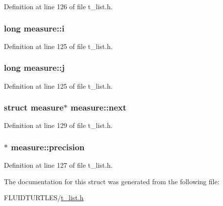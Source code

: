 Definition at line 126 of file t\-\_\-list.\-h.

\hypertarget{structmeasure_a8b24769b181ee06450ae86ecec544ba5}{
\subsubsection[{i}]{\setlength{\rightskip}{0pt plus 5cm}long measure\-::i}}\label{structmeasure_a8b24769b181ee06450ae86ecec544ba5}


Definition at line 125 of file t\-\_\-list.\-h.

\hypertarget{structmeasure_af77ad1ea1d09744bf12b5f07b7440bdf}{
\subsubsection[{j}]{\setlength{\rightskip}{0pt plus 5cm}long measure\-::j}}\label{structmeasure_af77ad1ea1d09744bf12b5f07b7440bdf}


Definition at line 125 of file t\-\_\-list.\-h.

\hypertarget{structmeasure_a04b4b97618f4685a0a8be6c92898750b}{
\subsubsection[{next}]{\setlength{\rightskip}{0pt plus 5cm}struct {\bf measure}$\ast$ measure\-::next}}\label{structmeasure_a04b4b97618f4685a0a8be6c92898750b}


Definition at line 129 of file t\-\_\-list.\-h.

\hypertarget{structmeasure_a495cb36301c6d80b966c39989a1ab727}{
\subsubsection[{precision}]{$\ast$ measure\-::precision}}\label{structmeasure_a495cb36301c6d80b966c39989a1ab727}


Definition at line 127 of file t\-\_\-list.\-h.



The documentation for this struct was generated from the following file\-:\begin{DoxyCompactItemize}
\item 
F\-L\-U\-I\-D\-T\-U\-R\-T\-L\-E\-S/\hyperlink{t__list_8h}{t\-\_\-list.\-h}\end{DoxyCompactItemize}
